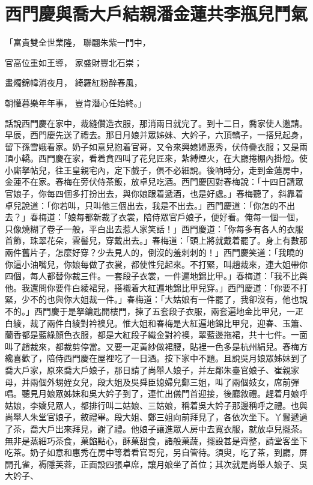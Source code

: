 %

\chapter{西門慶與喬大戶結親\KG 潘金蓮共李瓶兒鬥氣}

「富貴雙全世業隆，  聯翩朱紫一門中，

官高位重如王導，  家盛財豐北石崇；

畫燭錦幃消夜月，  綺羅紅粉醉春風，

朝懽暮樂年年事，  豈肯潛心任始終。」

話說西門慶在家中，裁縫儹造衣服，那消兩日就完了。到十二日，喬家使人邀請。早辰，西門慶先送了禮去。那日月娘并眾姊妹、大妗子，六頂轎子，一搭兒起身，留下孫雪娥看家。奶子如意兒抱着官哥，又令來興媳婦惠秀，伏侍疊衣服；又是兩頂小轎。西門慶在家，看着賁四叫了花兒匠來，紮縛煙火，在大廳捲棚內掛燈。使小廝拏帖兒，往王皇親宅內，定下戲子，俱不必細說。後响時分，走到金蓮房中，金蓮不在家。春梅在旁伏侍茶飯，放卓兒吃酒。西門慶因對春梅說：「十四日請眾官娘子，你每四個多打扮出去，與你娘跟着遞酒，也是好處。」春梅聽了，斜靠着卓兒說道：「你若叫，只叫他三個出去，我是不出去。」西門慶道：「你怎的不出去？」春梅道：「娘每都新裁了衣裳，陪侍眾官戶娘子，便好看。俺每一個一個，只像燒糊了卷子一般，平白出去惹人家笑話！」西門慶道：「你每多有各人的衣服首飾，珠翠花朵，雲髻兒，穿戴出去。」春梅道：「頭上將就戴着罷了。身上有數那兩件舊片子，怎麼好穿？少去見人的，倒沒的羞刺刺的！」西門慶笑道：「我曉的你這小油嘴兒，你娘每做了衣裳，都使性兒起來。不打緊，叫趙裁來，連大姐帶你四個，每人都替你裁三件。一套段子衣裳，一件遍地錦比甲。」春梅道：「我不比與他。我還問你要件白綾裙兒，搭襯着大紅遍地錦比甲兒穿。」西門慶道：「你要不打緊，少不的也與你大姐裁一件。」春梅道：「大姑娘有一件罷了，我卻沒有，他也說不的。」西門慶于是拏鑰匙開樓門，揀了五套段子衣服，兩套遍地金比甲兒，一疋白綾，裁了兩件白綾對衿襖兒。惟大姐和春梅是大紅遍地錦比甲兒，迎春、玉簫、蘭香都是藍綠顏色衣服，都是大紅段子織金對衿襖，翠藍邊拖裙，共十七件。一面叫了趙裁來，都裁剪停當。又要一疋黃紗做裙腰，貼裡一色多是杭州絹兒。春梅方纔喜歡了，陪侍西門慶在屋裡吃了一日酒。按下家中不題。且說吳月娘眾姊妹到了喬大戶家，原來喬大戶娘子，那日請了尚舉人娘子，并左鄰朱臺官娘子、崔親家母，并兩個外甥姪女兒，段大姐及吳舜臣媳婦兒鄭三姐，叫了兩個妓女，席前彈唱。聽見月娘眾姊妹和吳大妗子到了，連忙出儀門首迎接，後廳敘禮。趕着月娘呼姑娘，李嬌兒眾人，都排行叫二姑娘、三姑娘，稱着吳大妗子那邊稱呼之禮。也與尚舉人朱堂官娘子，敘禮畢。段大姐、鄭三姐向前拜見了，各依次坐下。丫鬟遞過了茶，喬大戶出來拜見，謝了禮。他娘子讓進眾人房中去寬衣服，就放卓兒擺茶。無非是蒸細巧茶食，菓餡點心，酥菓甜食，諸般菓蔬，擺設甚是齊整，請堂客坐下吃茶。奶子如意和惠秀在房中等着看官哥兒，另自管待。須臾，吃了茶，到廳，屏開孔雀，褥隱芙蓉，正面設四張卓席，讓月娘坐了首位；其次就是尚舉人娘子、吳大妗子、